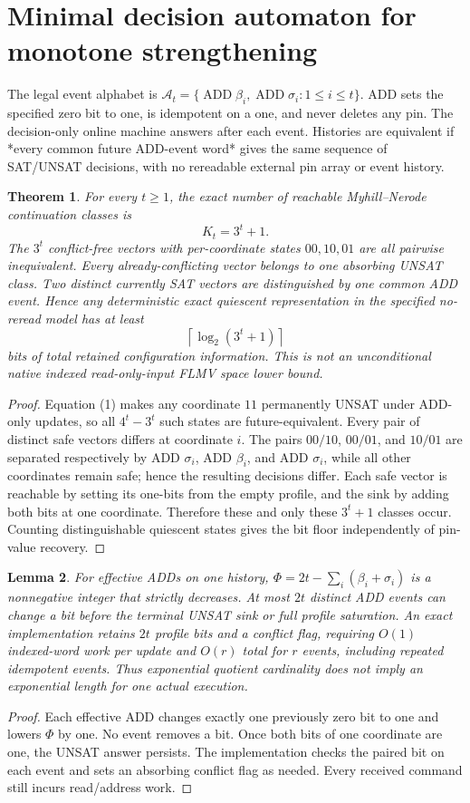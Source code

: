 \documentclass[11pt]{article}
\newtheorem{theorem}{Theorem}
\newtheorem{lemma}[theorem]{Lemma}
\begin{document}
\section{Minimal decision automaton for monotone strengthening}
The legal event alphabet is $\mathcal A_t=\{\operatorname{ADD}\beta_i,\operatorname{ADD}\sigma_i:1\le i\le t\}$. ADD sets the specified zero bit to one, is idempotent on a one, and never deletes any pin. The decision-only online machine answers after each event. Histories are equivalent if *every common future ADD-event word* gives the same sequence of SAT/UNSAT decisions, with no rereadable external pin array or event history.
\begin{theorem}
For every $t\ge1$, the exact number of reachable Myhill--Nerode continuation classes is
\[
\boxed{K_t=3^t+1.}
\]
The $3^t$ conflict-free vectors with per-coordinate states $00,10,01$ are all pairwise inequivalent. Every already-conflicting vector belongs to one absorbing UNSAT class. Two distinct currently SAT vectors are distinguished by \emph{one} common ADD event. Hence any deterministic exact quiescent representation in the specified no-reread model has at least
\[
\boxed{\left\lceil\log_2(3^t+1)\right\rceil}
\]
bits of total retained configuration information. This is not an unconditional native indexed read-only-input FLMV space lower bound.
\end{theorem}
\begin{proof}
Equation (1) makes any coordinate $11$ permanently UNSAT under ADD-only updates, so all $4^t-3^t$ such states are future-equivalent. Every pair of distinct safe vectors differs at coordinate $i$. The pairs $00/10$, $00/01$, and $10/01$ are separated respectively by ADD $\sigma_i$, ADD $\beta_i$, and ADD $\sigma_i$, while all other coordinates remain safe; hence the resulting decisions differ. Each safe vector is reachable by setting its one-bits from the empty profile, and the sink by adding both bits at one coordinate. Therefore these and only these $3^t+1$ classes occur. Counting distinguishable quiescent states gives the bit floor independently of pin-value recovery.
\end{proof}
\begin{lemma}
For effective ADDs on one history,
$\Phi=2t-\sum_i(\beta_i+\sigma_i)$ is a nonnegative integer that strictly decreases. At most $2t$ distinct ADD events can change a bit before the terminal UNSAT sink or full profile saturation. An exact implementation retains $2t$ profile bits and a conflict flag, requiring $O(1)$ indexed-word work per update and $O(r)$ total for $r$ events, including repeated idempotent events. Thus exponential quotient cardinality does not imply an exponential length for one actual execution.
\end{lemma}
\begin{proof}
Each effective ADD changes exactly one previously zero bit to one and lowers $\Phi$ by one. No event removes a bit. Once both bits of one coordinate are one, the UNSAT answer persists. The implementation checks the paired bit on each event and sets an absorbing conflict flag as needed. Every received command still incurs read/address work.
\end{proof}
\end{document}
